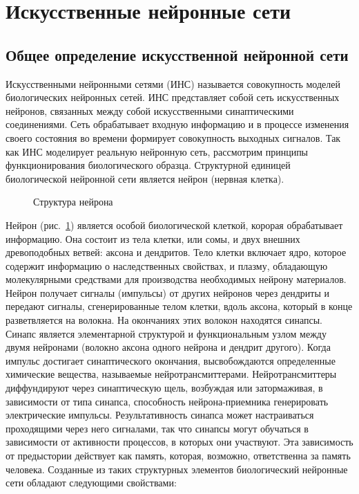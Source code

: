 \section{Искусственные нейронные сети}
\subsection{Общее определение искусственной нейронной сети}

Искусственными нейронными сетями (ИНС) называется совокупность моделей биологических нейронных сетей.
ИНС представляет собой сеть искусственных нейронов, связанных между собой искусственными синаптическими соединениями.
Сеть обрабатывает входную информацию и в процессе изменения своего состояния во времени формирует совокупность выходных сигналов.\cite{COURSE}
Так как ИНС моделирует реальную нейронную сеть, рассмотрим принципы функционирования биологического образца.
Структурной единицей биологической нейронной сети является нейрон (нервная клетка).
\begin{figure}[h]
\caption{Структура нейрона}
\label{ris:neuron}
\end{figure}
Нейрон (рис.~\ref{ris:neuron}) является особой биологической клеткой, корорая обрабатывает информацию.
Она состоит из тела клетки, или сомы, и двух внешних древоподобных ветвей: аксона и дендритов.
Тело клетки включает ядро, которое содержит информацию о наследственных свойствах, и плазму, обладающую молекулярными средствами для производства необходимых нейрону материалов.
Нейрон получает сигналы (импульсы) от других нейронов через дендриты и передают сигналы, сгенерированные телом клетки, вдоль аксона, который в конце разветвляется на волокна.
На окончаниях этих волокон находятся синапсы. 
Синапс является элементарной структурой и функциональным узлом между двумя нейронами (волокно аксона одного нейрона и дендрит другого).
Когда импульс достигает синаптического окончания, высвобождаются определенные химические вещества, называемые нейротрансмиттерами.
Нейротрансмиттеры диффундируют через синаптическую щель, возбуждая или затормаживая, в зависимости от типа синапса, способность нейрона-приемника генерировать электрические импульсы.
Результативность синапса может настраиваться проходящими через него сигналами, так что синапсы могут обучаться в зависимости от активности процессов, в которых они участвуют.
Эта зависимость от предыстории действует как память, которая, возможно, ответственна за память человека.
\cite{nn_int_jain}
Созданные из таких структурных элементов биологический нейронные сети обладают следующими свойствами:

